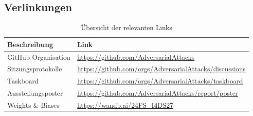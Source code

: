 \subsection*{Verlinkungen}
\begin{table}[H]
    \centering
        \begin{tabular}{|l|l|}
        \hline
        \textbf{Beschreibung} & \textbf{Link} \\ \hline
        GitHub Organisation & \href{https://github.com/AdversarialAttacks}{https://github.com/AdversarialAttacks} \\ \hline
        Sitzungsprotokolle & \href{https://github.com/orgs/AdversarialAttacks/discussions/categories/protokolle}{https://github.com/orgs/AdversarialAttacks/discussions} \\ \hline
        Taskboard & \href{https://github.com/orgs/AdversarialAttacks/projects/1/views/6}{https://github.com/orgs/AdversarialAttacks/taskboard} \\ \hline
        Ausstellungsposter & \href{https://github.com/AdversarialAttacks/report/blob/main/Adversarial-Attacks-Poster.pdf}{https://github.com/AdversarialAttacks/report/poster} \\ \hline
        Weights \& Biases & \href{https://wandb.ai/24FS_I4DS27}{https://wandb.ai/24FS\_I4DS27} \\ \hline
        \end{tabular}
    \caption{Übersicht der relevanten Links}
    \label{table-appendix:weitere-links}
\end{table}



